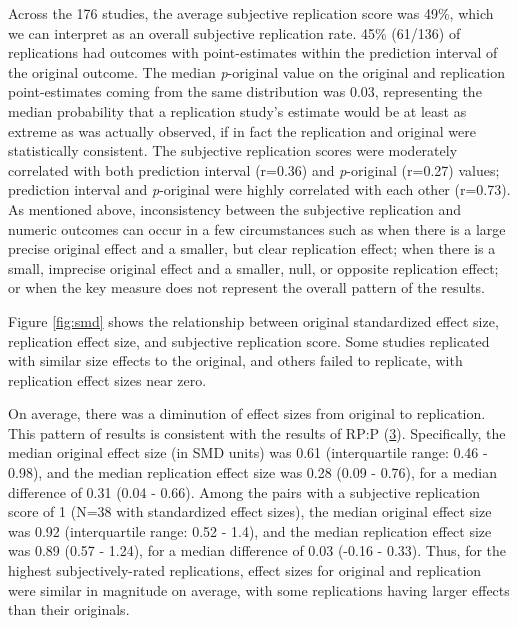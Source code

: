 \documentclass[
  english,
  a4paper,
]{article}
\begin{document}
Across the 176 studies, the average subjective replication score was 49\%, which we can interpret as an overall subjective replication rate. 45\% (61/136) of replications had outcomes with point-estimates within the prediction interval of the original outcome. The median \emph{p}-original value on the original and replication point-estimates coming from the same distribution was 0.03, representing the median probability that a replication study's estimate would be at least as extreme as was actually observed, if in fact the replication and original were statistically consistent. The subjective replication scores were moderately correlated with both prediction interval (r=0.36) and \emph{p}-original (r=0.27) values; prediction interval and \emph{p}-original were highly correlated with each other (r=0.73). As mentioned above, inconsistency between the subjective replication and numeric outcomes can occur in a few circumstances such as when there is a large precise original effect and a smaller, but clear replication effect; when there is a small, imprecise original effect and a smaller, null, or opposite replication effect; or when the key measure does not represent the overall pattern of the results.

Figure \ref{fig:smd} shows the relationship between original standardized effect size, replication effect size, and subjective replication score. Some studies replicated with similar size effects to the original, and others failed to replicate, with replication effect sizes near zero.

On average, there was a diminution of effect sizes from original to replication. This pattern of results is consistent with the results of RP:P (\protect\hyperlink{ref-openscienceconsortium2015}{3}). Specifically, the median original effect size (in SMD units) was 0.61 (interquartile range: 0.46 - 0.98), and the median replication effect size was 0.28 (0.09 - 0.76), for a median difference of 0.31 (0.04 - 0.66). Among the pairs with a subjective replication score of 1 (N=38 with standardized effect sizes), the median original effect size was 0.92 (interquartile range: 0.52 - 1.4), and the median replication effect size was 0.89 (0.57 - 1.24), for a median difference of 0.03 (-0.16 - 0.33). Thus, for the highest subjectively-rated replications, effect sizes for original and replication were similar in magnitude on average, with some replications having larger effects than their originals.
\end{document}
